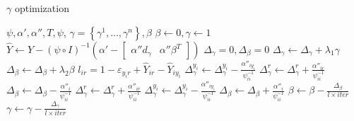 \begin{algorithm}
       \caption{$\gamma$ optimization}\label{alg:1}
        \begin{algorithmic}[1]
            \REQUIRE $\psi,\alpha',\alpha'',T,\psi$,
            \ENSURE $\gamma=\left\{\gamma^1,...,\gamma^n\right\}, \beta$
            \STATE $\beta \leftarrow 0, \gamma \leftarrow 1$
                \STATE $\hat Y \leftarrow Y - {\left( {\psi \circ I} \right)^{ - 1}}\left( {\alpha' - \left[ {\begin{array}{*{20}{c}}
{\alpha''d_\gamma }&{\alpha''\beta^T }
\end{array}} \right]} \right)$
                \STATE ${\Delta _\gamma }=0, {\Delta _\beta }=0$
                	\STATE ${\Delta _\gamma }\leftarrow {\Delta _\gamma }+\lambda_1\gamma$ 
                	\STATE ${\Delta _\beta }\leftarrow {\Delta _\beta }+\lambda_2\beta$
	                    \STATE $l_{ir} = 1 - {\varepsilon _{{y_i}r}} + {\hat Y_{ir}} - {\hat Y_{i{y_i}}}$
	                            \STATE $\Delta _\gamma^{{y_i}} \leftarrow \Delta _\gamma^{{y_i}} - \frac{{{\alpha''_{i{y_i}}}}}{{{\psi^{-1}_{ii}}}}$%
	                            \STATE $\Delta _\gamma^{{r}} \leftarrow \Delta _\gamma^{{r}} + \frac{{{\alpha''_{i{r}}}}}{{{\psi^{-1}_{ii}}}}$%
	                            \STATE ${\Delta _\beta } \leftarrow {\Delta _\beta } - \frac{{{\alpha''_i}}}{{{\psi^{-1}_{ii}}}}$
	                             \STATE $\Delta _\gamma^{{r}} \leftarrow \Delta _\gamma^{{r}} + \frac{{{\alpha''_{i{r}}}}}{{{\psi^{-1}_{ii}}}}$%
	                        \ELSE
	                            \STATE $\Delta _\gamma^{{y_i}} \leftarrow \Delta _\gamma^{{y_i}} - \frac{{{\alpha''_{i{y_i}}}}}{{{\psi^{-1}_{ii}}}}$
	                             \STATE        ${\Delta _\beta } \leftarrow {\Delta _\beta } + \frac{{{\alpha''_i}}}{{{\psi^{-1}_{ii}}}}$
	                        \ENDIF
	                    \ENDIF
	                 \ENDFOR %
                \ENDFOR %
                \STATE $\beta \leftarrow \beta - \frac{{{\Delta _\beta }}}{{l \times {iter} }}$
                \STATE $\gamma  \leftarrow \gamma  - \frac{{{\Delta _\gamma }}}{{l\times {iter} }}$
             \ENDFOR %
        \end{algorithmic}
\end{algorithm}